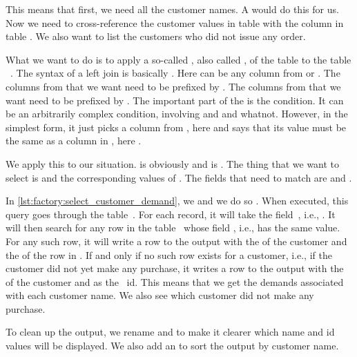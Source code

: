 This means that first, we need all the customer names.
A  would do this for us.
Now we need to cross-reference the customer  values in table  with the column  in table .
We also want to list the customers who did not issue any order.%
%
\begin{sloppypar}%
What we want to do is to apply a so-called , also called , of the table  to the table ~\cite{PGDG:PD:JT}.
The syntax of a left join is basically .
Here  can be any column from  or .
The columns from  that we want need to be prefixed by .
The columns from  that we want need to be prefixed by .
The important part of the  is the  condition.
It can be an arbitrarily complex condition, involving  and  and whatnot.
However, in the simplest form, it just picks a column from , here  and says that its value must be the same as a column in , here .%
\end{sloppypar}%
%
We apply this to our situation.
 is obviously  and  is .
The thing that we want to select is  and the corresponding values of .
The fields that need to match are  and .%
%
\begin{sloppypar}%
In \cref{lst:factory:select_customer_demand}, we  and we do so .
When executed, this query goes through the table~.
For each record, it will take the field~, i.e., .
It will then search for any row in the table~ whose field , i.e.,  has the same value.
For any such row, it will write a row to the output with the  of the customer and the  of the row in .
If and only if no such row exists for a customer, i.e., if the customer did not yet make any purchase, it writes a row to the output with the  of the customer and  as the ~id.
This means that we get the demands associated with each customer name.
We also see which customer did not make any purchase.%
\end{sloppypar}%
%
To clean up the output, we rename  and  to make it clearer which name and id values will be displayed.
We also add an  to sort the output by customer name.

